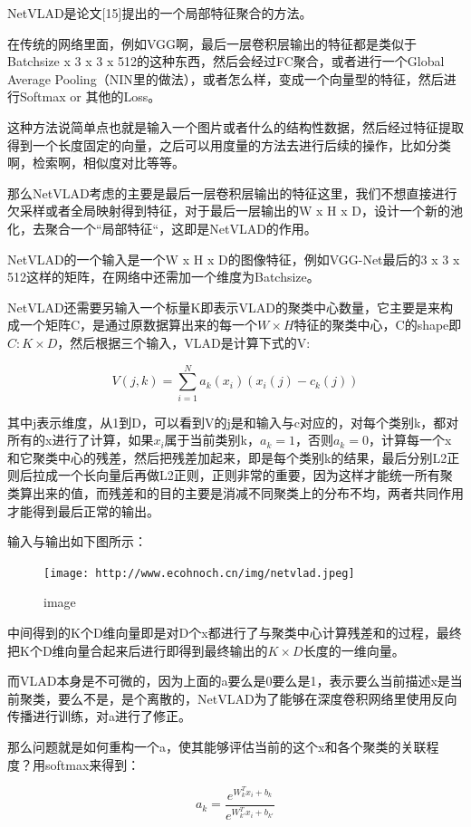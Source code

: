 NetVLAD是论文{[}15{]}提出的一个局部特征聚合的方法。

在传统的网络里面，例如VGG啊，最后一层卷积层输出的特征都是类似于Batchsize
x 3 x 3 x 512的这种东西，然后会经过FC聚合，或者进行一个Global Average
Pooling（NIN里的做法），或者怎么样，变成一个向量型的特征，然后进行Softmax
or 其他的Loss。

这种方法说简单点也就是输入一个图片或者什么的结构性数据，然后经过特征提取得到一个长度固定的向量，之后可以用度量的方法去进行后续的操作，比如分类啊，检索啊，相似度对比等等。

那么NetVLAD考虑的主要是最后一层卷积层输出的特征这里，我们不想直接进行欠采样或者全局映射得到特征，对于最后一层输出的W
x H x D，设计一个新的池化，去聚合一个``局部特征``，这即是NetVLAD的作用。

NetVLAD的一个输入是一个W x H x D的图像特征，例如VGG-Net最后的3 x 3 x
512这样的矩阵，在网络中还需加一个维度为Batchsize。

NetVLAD还需要另输入一个标量K即表示VLAD的聚类中心数量，它主要是来构成一个矩阵C，是通过原数据算出来的每一个\(W \times H\)特征的聚类中心，C的shape即\(C: K \times D\)，然后根据三个输入，VLAD是计算下式的V:

\[V(j, k) = \sum_{i=1}^{N}{a_k(x_i)(x_i(j) - c_k(j))}\]

其中j表示维度，从1到D，可以看到V的j是和输入与c对应的，对每个类别k，都对所有的x进行了计算，如果\(x_i\)属于当前类别k，\(a_k=1\)，否则\(a_k=0\)，计算每一个x和它聚类中心的残差，然后把残差加起来，即是每个类别k的结果，最后分别L2正则后拉成一个长向量后再做L2正则，正则非常的重要，因为这样才能统一所有聚类算出来的值，而残差和的目的主要是消减不同聚类上的分布不均，两者共同作用才能得到最后正常的输出。

输入与输出如下图所示：

\begin{figure}
\centering
\texttt{[image: http://www.ecohnoch.cn/img/netvlad.jpeg]}
\caption{image}
\end{figure}

中间得到的K个D维向量即是对D个x都进行了与聚类中心计算残差和的过程，最终把K个D维向量合起来后进行即得到最终输出的\(K \times D\)长度的一维向量。

而VLAD本身是不可微的，因为上面的a要么是0要么是1，表示要么当前描述x是当前聚类，要么不是，是个离散的，NetVLAD为了能够在深度卷积网络里使用反向传播进行训练，对a进行了修正。

那么问题就是如何重构一个a，使其能够评估当前的这个x和各个聚类的关联程度？用softmax来得到：

\[a_k = \frac{e^{W_k^T x_i + b_k}}{e^{W_{k'}^T x_i + b_{k'}}}\]

